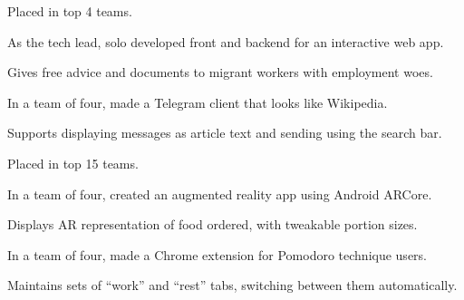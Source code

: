 \documentclass[]{deedy-resume-openfont}
\begin{document}
\begin{minipage}[t]{0.66\textwidth}
\begin{tightemize}
\item Placed in top 4 teams.
\item As the tech lead, solo developed front and backend for an interactive web app.
\item Gives free advice and documents to migrant workers with employment woes.
\end{tightemize}
\sectionsep

\begin{tightemize}
\item In a team of four, made a Telegram client that looks like Wikipedia.
\item Supports displaying messages as article text and sending using the search bar.
\end{tightemize}
\sectionsep

\begin{tightemize}
\item Placed in top 15 teams.
\item In a team of four, created an augmented reality app using Android ARCore.
\item Displays AR representation of food ordered, with tweakable portion sizes.
\end{tightemize}
\sectionsep

\begin{tightemize}
\item In a team of four, made a Chrome extension for Pomodoro technique users.
\item Maintains sets of ``work'' and ``rest'' tabs, switching between them automatically.
\end{tightemize}
\sectionsep



\end{minipage}
\end{document}
